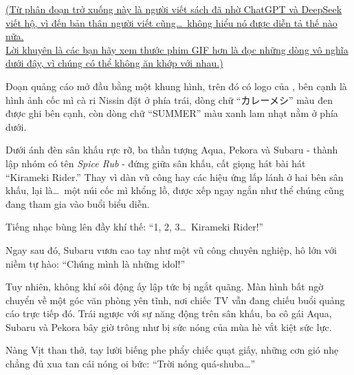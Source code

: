 \documentclass[../main.tex]{subfiles}
\begin{document}

\begin{center}
  \uline{(Từ phân đoạn trở xuống này là người viết sách đã nhờ ChatGPT và DeepSeek viết hộ, vì đến bản thân người viết cũng\dots\ không hiểu nó được diễn tả thế nào nữa.\\
    Lời khuyên là các bạn hãy xem thước phim GIF hơn là đọc những dòng vô nghĩa dưới đây, vì chúng có thể không ăn khớp với nhau.)}
\end{center}

Đoạn quảng cáo mở đầu bằng một khung hình, trên đó có logo của \hll, bên cạnh là hình ảnh cốc mì cà ri Nissin đặt ở phía trái, dòng chữ ``カレーメシ'' màu đen được ghi bên cạnh, còn dòng chữ ``SUMMER'' màu xanh lam nhạt nằm ở phía dưới.


Dưới ánh đèn sân khấu rực rỡ, ba thần tượng Aqua, Pekora và Subaru - thành lập nhóm có tên \textit{Spice Rub} - đứng giữa sân khấu, cất giọng hát bài hát ``Kirameki Rider.'' Thay vì dàn vũ công hay các hiệu ứng lấp lánh ở hai bên sân khấu, lại là\dots\ một núi cốc mì khổng lồ, được xếp ngay ngắn như thể chúng cũng đang tham gia vào buổi biểu diễn.

Tiếng nhạc bùng lên đầy khí thế: ``1, 2, 3\dots\ Kirameki Rider!''

Ngay sau đó, Subaru vươn cao tay như một vũ công chuyên nghiệp, hô lớn với niềm tự hào: ``Chúng mình là những idol!''


Tuy nhiên, không khí sôi động ấy lập tức bị ngắt quãng. Màn hình bất ngờ chuyển về một góc văn phòng yên tĩnh, nơi chiếc TV vẫn đang chiếu buổi quảng cáo trực tiếp đó. Trái ngược với sự năng động trên sân khấu, ba cô gái Aqua, Subaru và Pekora bây giờ trông như bị sức nóng của mùa hè vắt kiệt sức lực.

Nàng Vịt than thở, tay lười biếng phe phẩy chiếc quạt giấy, những cơn gió nhẹ chẳng đủ xua tan cái nóng oi bức: ``Trời nóng quá-shuba\dots''
\end{document}
